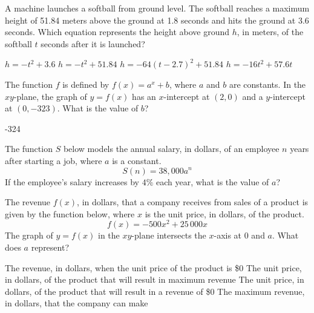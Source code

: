 \question[1]
A machine launches a softball from ground level. The softball reaches a maximum height of 51.84 meters above the ground at 1.8 seconds and hits the ground at 3.6 seconds. Which equation represents the height above ground $h$, in meters, of the softball $t$ seconds after it is launched?
\begin{choices}
  \choice $h=-t^{2}+3.6$
  \choice $h=-t^{2}+51.84$
  \choice $h=-64(t-2.7)^{2}+51.84$
  \CorrectChoice $h=-16t^{2}+57.6t$
\end{choices}

\question[1]
The function $f$ is defined by $f(x)=a^{x}+b$, where $a$ and $b$ are constants. In the $xy$-plane, the graph of $y=f(x)$ has an $x$-intercept at $(2,0)$ and a $y$-intercept at $(0,-323)$. What is the value of $b$?
\begin{solution}
-324
\end{solution}


\newpage



\question[1]
The function $S$ below models the annual salary, in dollars, of an employee $n$ years after starting a job, where $a$ is a constant.
\[
  S(n)=38,000 a^{n}
\]
If the employee's salary increases by $4\%$ each year, what is the value of $a$?
\begin{choices}
\end{choices}

\question[1]
The revenue $f(x)$, in dollars, that a company receives from sales of a product is given by the function below, where $x$ is the unit price, in dollars, of the product.
\[
  f(x)=-500 x^{2}+25\,000 x
\]
The graph of $y=f(x)$ in the $xy$-plane intersects the $x$-axis at 0 and $a$. What does $a$ represent?
\begin{choices}
  \choice The revenue, in dollars, when the unit price of the product is \$0
  \choice The unit price, in dollars, of the product that will result in maximum revenue
  \CorrectChoice The unit price, in dollars, of the product that will result in a revenue of \$0
  \choice The maximum revenue, in dollars, that the company can make
\end{choices}



\newpage



